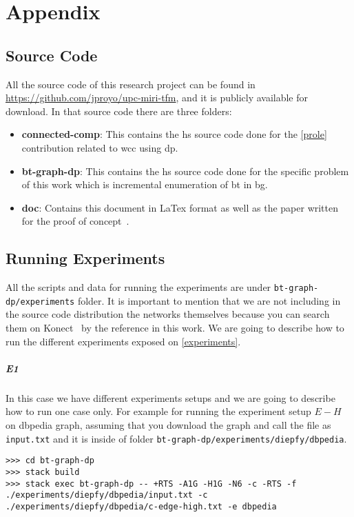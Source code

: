 \chapter{Appendix}
\section{Source Code}
All the source code of this research project can be found in \url{https://github.com/jproyo/upc-miri-tfm}, and it is publicly available for download.
In that source code there are three folders:

\begin{itemize}
  \item \textbf{connected-comp}: This contains the \acrshort{hs} source code done for the \autoref{prole} contribution related to \acrfull{wcc} using \acrshort{dp}.
  \item \textbf{bt-graph-dp}: This contains the \acrshort{hs} source code done for the specific problem of this work which is incremental enumeration of \acrlong{bt} in \acrlong{bg}.
  \item \textbf{doc}: Contains this document in LaTex format as well as the paper written for the proof of concept~\cite{prole21}.
\end{itemize}

\section{Running Experiments}\label{apx:running:experiments}
All the scripts and data for running the experiments are under \texttt{bt-graph-dp/experiments} folder.
It is important to mention that we are not including in the source code distribution the networks themselves because you can search them on Konect~\cite{konect} by the reference in this work.
We are going to describe how to run the different experiments exposed on \autoref{experiments}. 

\paragraph{E1} In this case we have different experiments setups and we are going to describe how to run one case only.
For example for running the experiment setup $E-H$ on \acrshort{dbpedia} graph, assuming that you download the graph and call the file as 
\texttt{input.txt} and it is inside of folder \texttt{bt-graph-dp/experiments/diepfy/dbpedia}.
\begin{verbatim}
>>> cd bt-graph-dp
>>> stack build
>>> stack exec bt-graph-dp -- +RTS -A1G -H1G -N6 -c -RTS -f ./experiments/diepfy/dbpedia/input.txt -c ./experiments/diepfy/dbpedia/c-edge-high.txt -e dbpedia
\end{verbatim}


